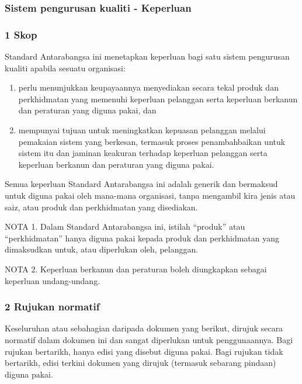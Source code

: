 \documentclass[
]{article}
\begin{document}
\hypertarget{sistem-pengurusan-kualiti---keperluan}{%
\subsubsection{Sistem pengurusan kualiti -
Keperluan}\label{sistem-pengurusan-kualiti---keperluan}}

\hypertarget{skop}{%
\subsubsection{1 Skop}\label{skop}}

Standard Antarabangsa ini menetapkan keperluan bagi satu sistem
pengurusan kualiti apabila sesuatu organisasi:

\begin{enumerate}
\def\labelenumi{\alph{enumi})}
\item
  perlu menunjukkan keupayaannya menyediakan secara tekal produk dan
  perkhidmatan yang memenuhi keperluan pelanggan serta keperluan
  berkanun dan peraturan yang diguna pakai, dan
\item
  mempunyai tujuan untuk meningkatkan kepuasan pelanggan melalui
  pemakaian sistem yang berkesan, termasuk proses penambahbaikan untuk
  sistem itu dan jaminan keakuran terhadap keperluan pelanggan serta
  keperluan berkanun dan peraturan yang diguna pakai.
\end{enumerate}

Semua keperluan Standard Antarabangsa ini adalah generik dan bermaksud
untuk diguna pakai oleh mana-mana organisasi, tanpa mengambil kira jenis
atau saiz, atau produk dan perkhidmatan yang disediakan.

NOTA 1. Dalam Standard Antarabangsa ini, istilah ``produk'' atau
``perkhidmatan'' hanya diguna pakai kepada produk dan perkhidmatan yang
dimaksudkan untuk, atau diperlukan oleh, pelanggan.

NOTA 2. Keperluan berkanun dan peraturan boleh diungkapkan sebagai
keperluan undang-undang.

\hypertarget{rujukan-normatif}{%
\subsubsection{2 Rujukan normatif}\label{rujukan-normatif}}

Keseluruhan atau sebahagian daripada dokumen yang berikut, dirujuk
secara normatif dalam dokumen ini dan sangat diperlukan untuk
penggunaannya. Bagi rujukan bertarikh, hanya edisi yang disebut diguna
pakai. Bagi rujukan tidak bertarikh, edisi terkini dokumen yang dirujuk
(termasuk sebarang pindaan) diguna pakai.
\end{document}
